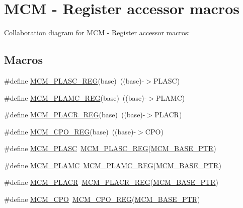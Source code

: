 \hypertarget{group___m_c_m___register___accessor___macros}{}\section{M\+CM -\/ Register accessor macros}
\label{group___m_c_m___register___accessor___macros}
Collaboration diagram for M\+CM -\/ Register accessor macros\+:
\subsection*{Macros}
\begin{DoxyCompactItemize}
\item 
\#define \hyperlink{group___m_c_m___register___accessor___macros_ga5f5057d86df1e237371d76a2b99689ce}{M\+C\+M\+\_\+\+P\+L\+A\+S\+C\+\_\+\+R\+EG}(base)~((base)-\/$>$P\+L\+A\+SC)
\item 
\#define \hyperlink{group___m_c_m___register___accessor___macros_ga79ed4435da37b341c75f7372eb4f33f7}{M\+C\+M\+\_\+\+P\+L\+A\+M\+C\+\_\+\+R\+EG}(base)~((base)-\/$>$P\+L\+A\+MC)
\item 
\#define \hyperlink{group___m_c_m___register___accessor___macros_ga7352403c798ebab30d2179fa9130011a}{M\+C\+M\+\_\+\+P\+L\+A\+C\+R\+\_\+\+R\+EG}(base)~((base)-\/$>$P\+L\+A\+CR)
\item 
\#define \hyperlink{group___m_c_m___register___accessor___macros_ga1f78c796fdf559bbbe78af4f5c1f0de3}{M\+C\+M\+\_\+\+C\+P\+O\+\_\+\+R\+EG}(base)~((base)-\/$>$C\+PO)
\item 
\#define \hyperlink{group___m_c_m___register___accessor___macros_ga1741cb7cdef46052c2ac9e7d28fb2b53}{M\+C\+M\+\_\+\+P\+L\+A\+SC}~\hyperlink{group___m_c_m___register___accessor___macros_ga5f5057d86df1e237371d76a2b99689ce}{M\+C\+M\+\_\+\+P\+L\+A\+S\+C\+\_\+\+R\+EG}(\hyperlink{group___m_c_m___peripheral_gad41e931f176c230831e3dbad45117841}{M\+C\+M\+\_\+\+B\+A\+S\+E\+\_\+\+P\+TR})
\item 
\#define \hyperlink{group___m_c_m___register___accessor___macros_ga63f36c9c5700eb5fca4fe3852e1d6dfd}{M\+C\+M\+\_\+\+P\+L\+A\+MC}~\hyperlink{group___m_c_m___register___accessor___macros_ga79ed4435da37b341c75f7372eb4f33f7}{M\+C\+M\+\_\+\+P\+L\+A\+M\+C\+\_\+\+R\+EG}(\hyperlink{group___m_c_m___peripheral_gad41e931f176c230831e3dbad45117841}{M\+C\+M\+\_\+\+B\+A\+S\+E\+\_\+\+P\+TR})
\item 
\#define \hyperlink{group___m_c_m___register___accessor___macros_gaa410b4b505027d7ff0aab20f87e2c2a5}{M\+C\+M\+\_\+\+P\+L\+A\+CR}~\hyperlink{group___m_c_m___register___accessor___macros_ga7352403c798ebab30d2179fa9130011a}{M\+C\+M\+\_\+\+P\+L\+A\+C\+R\+\_\+\+R\+EG}(\hyperlink{group___m_c_m___peripheral_gad41e931f176c230831e3dbad45117841}{M\+C\+M\+\_\+\+B\+A\+S\+E\+\_\+\+P\+TR})
\item 
\#define \hyperlink{group___m_c_m___register___accessor___macros_ga96a3cf196007edffa1d1ee83717073da}{M\+C\+M\+\_\+\+C\+PO}~\hyperlink{group___m_c_m___register___accessor___macros_ga1f78c796fdf559bbbe78af4f5c1f0de3}{M\+C\+M\+\_\+\+C\+P\+O\+\_\+\+R\+EG}(\hyperlink{group___m_c_m___peripheral_gad41e931f176c230831e3dbad45117841}{M\+C\+M\+\_\+\+B\+A\+S\+E\+\_\+\+P\+TR})
\end{DoxyCompactItemize}


